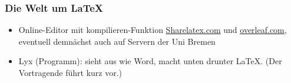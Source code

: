 \begin{frame}
\frametitle{Die Welt um \LaTeX}
\begin{itemize}
\item Online-Editor mit kompilieren-Funktion \url{Sharelatex.com} und \url{overleaf.com}, eventuell demnächst auch auf Servern der Uni Bremen
\item Lyx (Programm): sieht aus wie Word, macht unten drunter \LaTeX. (Der Vortragende führt kurz vor.)
\end{itemize}
\end{frame}
